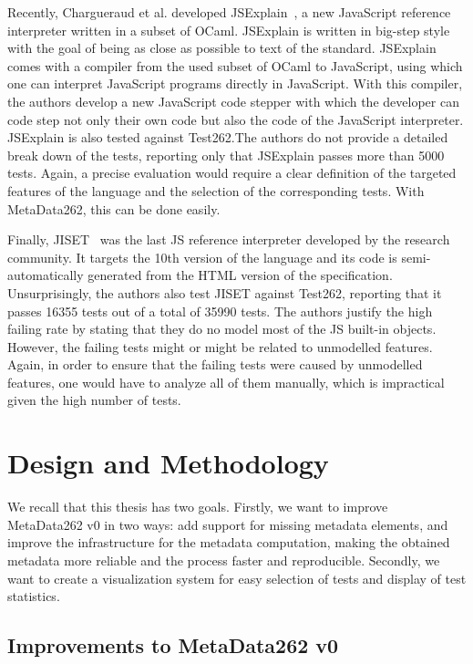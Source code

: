 \documentclass[runningheads]{llncs}
\begin{document}
Recently, Chargueraud et al. developed JSExplain~\cite{JSExplain-2018}, a new JavaScript reference interpreter written in a subset of OCaml. JSExplain is written in big-step style with the goal of being as close as possible to text of the standard. JSExplain comes with a compiler from the used subset of OCaml to JavaScript, using which one can interpret JavaScript programs directly in JavaScript. With this compiler, the authors develop a new JavaScript code stepper with which the developer can code step not only their own code but also the code of the JavaScript interpreter. JSExplain is also tested  against Test262.The authors do not provide a detailed break down of the tests, reporting only that JSExplain passes more than 5000 tests. Again, a precise evaluation would require a clear definition of the targeted features of the language and the selection of the corresponding tests. With MetaData262, this can be done easily.

Finally, JISET~\cite{JISET-2020} was the last JS reference interpreter developed by the research community. It targets the 10th version of the language and its code is semi-automatically generated from the HTML version of the specification. Unsurprisingly, the authors also test JISET against Test262, reporting that it passes  16355 tests out of a total of 35990 tests. The authors justify the high failing rate by stating that they do no model most of the JS built-in objects. However, the failing tests might or might be related to unmodelled features. Again, in order to ensure that the failing tests were caused by unmodelled features, one would have to analyze all of them manually, which is impractical given the high number of tests.


\section{Design and Methodology}
\label{sec:Design and Methodology}



We recall that this thesis has two goals. Firstly, we want to improve MetaData262 v0 in two ways: add support for missing metadata elements, and improve the infrastructure for the metadata computation, making the obtained metadata more reliable and the process faster and reproducible. Secondly, we want to create a visualization system for easy selection of tests and display of test statistics.


\subsection{Improvements to MetaData262 v0}
\label{sub:improvements_to_metadata262_v0}
\end{document}
